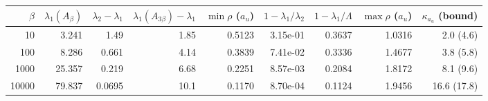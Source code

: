 \begin{tabular}{rrrrrrrrr}
\toprule
$\beta$ & $\lambda_1(A_\beta)$ & $\lambda_2-\lambda_1$ & $\lambda_1(A_{3\beta})-\lambda_1$ & $\min\rho$ ($a_u$) & $1-\lambda_1/\lambda_2$ & $1-\lambda_1/\Lambda$ & $\max\rho$ ($a_u$) & $\kappa_{a_u}$ (bound) \\
\midrule
10 & 3.241 & 1.49 & 1.85 & 0.5123 & 3.15e-01 & 0.3637 & 1.0316 & 2.0 (4.6) \\
100 & 8.286 & 0.661 & 4.14 & 0.3839 & 7.41e-02 & 0.3336 & 1.4677 & 3.8 (5.8) \\
1000 & 25.357 & 0.219 & 6.68 & 0.2251 & 8.57e-03 & 0.2084 & 1.8172 & 8.1 (9.6) \\
10000 & 79.837 & 0.0695 & 10.1 & 0.1170 & 8.70e-04 & 0.1124 & 1.9456 & 16.6 (17.8) \\
\bottomrule
\end{tabular}
